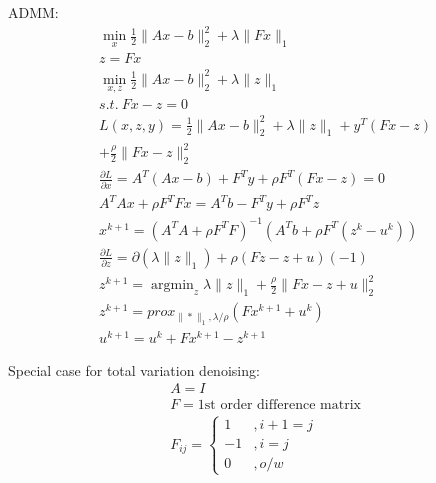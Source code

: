 \documentclass[8pt]{extarticle}
\DeclareMathOperator*{\argmin}{argmin}
\newcommand{\norm}[1]{\|#1\|}
\begin{document}
\begin{multicols*}{2}
  ADMM:
  \begin{align*}
    &\min_x \frac{1}{2}\norm{Ax-b}_2^2 + \lambda \norm{Fx}_1\\
    &z=Fx\\
    &\min_{x,z} \frac{1}{2}\norm{Ax-b}_2^2 + \lambda \norm{z}_1\\
    &s.t.\ Fx-z=0\\
    &L(x,z,y) = \frac{1}{2}\norm{Ax-b}_2^2 + \lambda \norm{z}_1 + y^T(Fx-z)\\
    &+ \frac{\rho}{2}\norm{Fx-z}_2^2\\
    &\frac{\partial L}{\partial x} = A^T(Ax-b) + F^T y + \rho F^T(Fx-z)=0\\
    &A^T Ax + \rho F^TFx = A^T b - F^T y + \rho F^T z\\
    &x^{k+1} = (A^T A + \rho F^T F)^{-1}(A^T b + \rho F^T (z^k-u^k))\\
    &\frac{\partial L}{\partial z} = \partial (\lambda \norm{z}_1) + \rho(Fz-z+u)(-1)\\
    &z^{k+1} = \argmin_z \lambda \norm{z}_1 + \frac{\rho}{2} \norm{Fx-z+u}_2^2\\
    &z^{k+1} = prox_{\norm{*}_1, \lambda/\rho} (Fx^{k+1}+u^k)\\
    &u^{k+1} = u^k + Fx^{k+1} - z^{k+1}
  \end{align*}
    
  Special case for total variation denoising:
  \begin{align*}
    &A=I\\
    &F=\text{1st order difference matrix}\\
    &F_{ij}=
      \begin{cases}
        1 &, i+1=j\\
        -1&, i=j\\
        0&, o/w
      \end{cases}
  \end{align*}

  \vfill\null
  \columnbreak


\end{multicols*}
\end{document}
